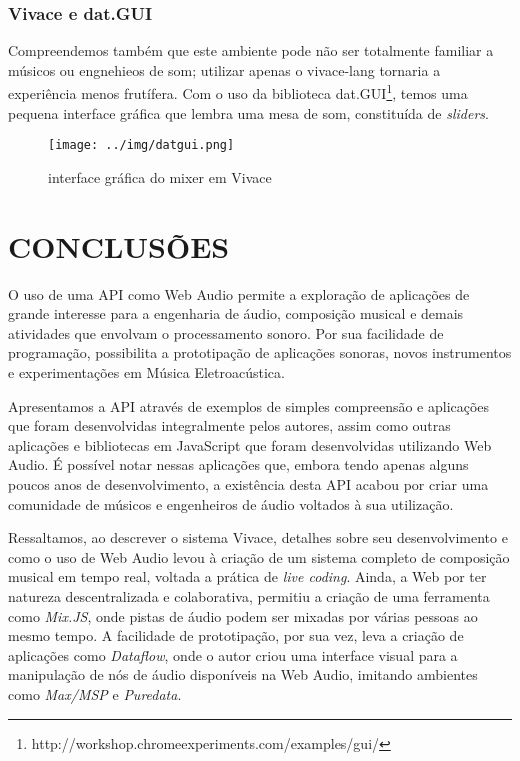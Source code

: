 \documentclass
  [ams,pdfout]%
        {aesbr}
\begin{document}
\subsubsection{Vivace e dat.GUI}

Compreendemos também que este ambiente pode não ser totalmente
familiar a músicos ou engnehieos de som; utilizar apenas o vivace-lang
tornaria a experiência menos frutífera. Com o uso da biblioteca
dat.GUI\footnote{http://workshop.chromeexperiments.com/examples/gui/},
temos uma pequena interface gráfica que lembra uma mesa de som,
constituída de \emph{sliders}.

\begin{figure}[htpb]
  \begin{center}
    \texttt{[image: ../img/datgui.png]}
    \caption{interface gráfica do mixer em Vivace}
    \label{figure:vivace}
  \end{center}
\end{figure}

\section{CONCLUSÕES}

O uso de uma API como Web Audio permite a exploração de aplicações de
grande interesse para a engenharia de áudio, composição musical e
demais atividades que envolvam o processamento sonoro. Por sua
facilidade de programação, possibilita a prototipação de aplicações
sonoras, novos instrumentos e experimentações em Música
Eletroacústica.

Apresentamos a API através de exemplos de simples compreensão e
aplicações que foram desenvolvidas integralmente pelos autores, assim
como outras aplicações e bibliotecas em JavaScript que foram
desenvolvidas utilizando Web Audio. É possível notar nessas aplicações
que, embora tendo apenas alguns poucos anos de desenvolvimento, a
existência desta API acabou por criar uma comunidade de músicos e
engenheiros de áudio voltados à sua utilização.

Ressaltamos, ao descrever o sistema Vivace, detalhes sobre seu
desenvolvimento e como o uso de Web Audio levou à criação de um
sistema completo de composição musical em tempo real, voltada a
prática de \emph{live coding}. Ainda, a Web por ter natureza
descentralizada e colaborativa, permitiu a criação de uma ferramenta
como \emph{Mix.JS}, onde pistas de áudio podem ser mixadas por várias
pessoas ao mesmo tempo. A facilidade de prototipação, por sua vez,
leva a criação de aplicações como \emph{Dataflow}, onde o autor criou
uma interface visual para a manipulação de nós de áudio disponíveis na
Web Audio, imitando ambientes como \emph{Max/MSP} e \emph{Puredata}.

%
\end{document}
